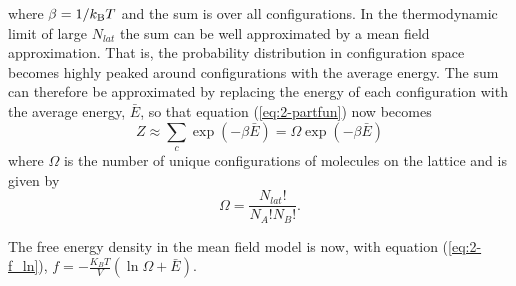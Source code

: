 where $\beta = 1/k_{\rm B} T$ and the sum is over all configurations. In the thermodynamic limit of large $N_{lat}$ the sum can be well approximated by a mean field approximation. That is, the probability distribution in configuration space becomes highly peaked around configurations with the average energy. The sum can therefore be approximated by replacing the energy of each configuration with the average energy, $\bar{E}$, so that equation (\ref{eq:2-partfun}) now becomes
\begin{equation}
    Z \approx \sum_c \exp(-\beta \bar{E}) = \Omega \exp(-\beta \bar{E})
\end{equation}
where $\Omega$ is the number of unique configurations of molecules on the lattice and is given by
\begin{equation}
    \Omega = \frac{N_{lat}!}{N_A! N_B!}.
\end{equation}

The free energy density in the mean field model is now, with equation (\ref{eq:2-f_ln}), $f = -\frac{K_B T}{V} (\ln \Omega + \bar{E})$.

